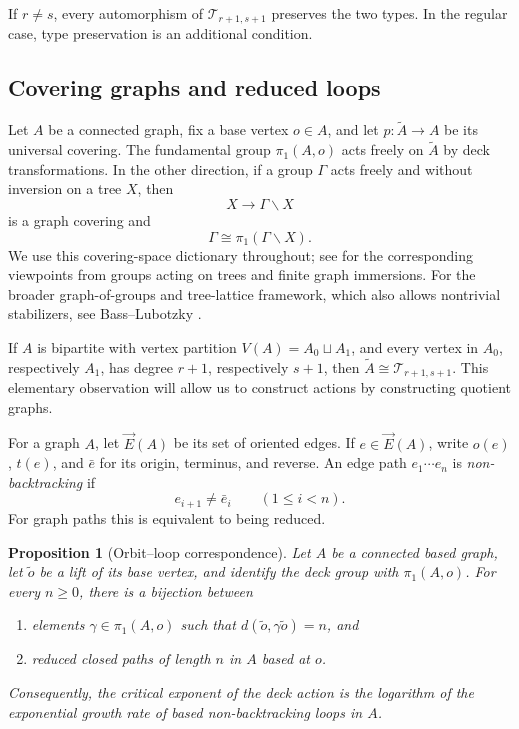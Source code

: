 \documentclass[11pt]{amsart}
\theoremstyle{plain}
\newtheorem{proposition}[theorem]{Proposition}
\theoremstyle{definition}
\theoremstyle{remark}
\newcommand{\T}{\mathcal T}
\begin{document}
If \(r\neq s\), every automorphism of \(\T_{r+1,s+1}\) preserves the two
types.  In the regular case, type preservation is an additional condition.

\subsection{Covering graphs and reduced loops}

Let \(A\) be a connected graph, fix a base vertex \(o\in A\), and let
\(p:\widetilde A\to A\) be its universal covering.  The fundamental group
\(\pi_1(A,o)\) acts freely on \(\widetilde A\) by deck transformations.  In
the other direction, if a group \(\Gamma\) acts freely and without inversion
on a tree \(X\), then
\[
  X\longrightarrow \Gamma\backslash X
\]
is a graph covering and
\[
  \Gamma\cong\pi_1(\Gamma\backslash X).
\]
We use this covering-space dictionary throughout; see
\cite{SerreTrees,Stallings1983} for the corresponding viewpoints from
groups acting on trees and finite graph immersions.
For the broader graph-of-groups and tree-lattice framework, which also
allows nontrivial stabilizers, see Bass--Lubotzky \cite{BassLubotzky2001}.

If \(A\) is bipartite with vertex partition \(V(A)=A_0\sqcup A_1\), and
every vertex in \(A_0\), respectively \(A_1\), has degree \(r+1\),
respectively \(s+1\), then
\(\widetilde A\cong\T_{r+1,s+1}\).  This elementary observation will allow us
to construct actions by constructing quotient graphs.

For a graph \(A\), let \(\vec E(A)\) be its set of oriented edges.  If
\(e\in\vec E(A)\), write \(o(e)\), \(t(e)\), and \(\bar e\) for its origin,
terminus, and reverse.  An edge path \(e_1\cdots e_n\) is
\emph{non-backtracking} if
\[
  e_{i+1}\neq\bar e_i\qquad(1\leq i<n).
\]
For graph paths this is equivalent to being reduced.

\begin{proposition}[Orbit--loop correspondence]\label{prop:orbit-loop}
Let \(A\) be a connected based graph, let \(\widetilde o\) be a lift of its
base vertex, and identify the deck group with \(\pi_1(A,o)\).  For every
\(n\geq0\), there is a bijection between
\begin{enumerate}[label=(\roman*)]
  \item elements \(\gamma\in\pi_1(A,o)\) such that
    \(d(\widetilde o,\gamma\widetilde o)=n\), and
  \item reduced closed paths of length \(n\) in \(A\) based at \(o\).
\end{enumerate}
Consequently, the critical exponent of the deck action is the logarithm of
the exponential growth rate of based non-backtracking loops in \(A\).
\end{proposition}
\end{document}
